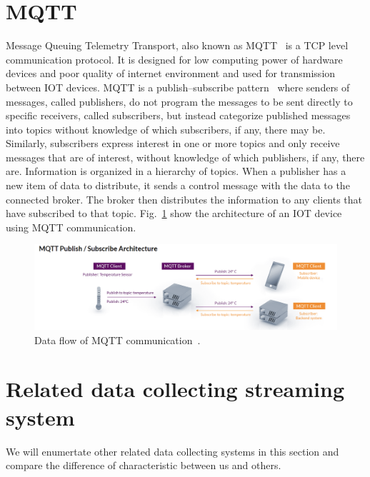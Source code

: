 \section{MQTT}
Message Queuing Telemetry Transport, also known as MQTT~\cite{mqtt-intro} is a TCP level communication protocol. It is designed for low computing power of hardware devices and poor quality of internet environment and used for transmission between IOT devices. MQTT is a publish–subscribe pattern~\cite{pub-sub} where senders of messages, called publishers, do not program the messages to be sent directly to specific receivers, called subscribers, but instead categorize published messages into topics without knowledge of which subscribers, if any, there may be. Similarly, subscribers express interest in one or more topics and only receive messages that are of interest, without knowledge of which publishers, if any, there are. Information is organized in a hierarchy of topics. When a publisher has a new item of data to distribute, it sends a control message with the data to the connected broker. The broker then distributes the information to any clients that have subscribed to that topic. Fig.~\ref{fig:mqtt-data-flow} show the architecture of an IOT device using MQTT communication. 

\begin{figure}[H]
    \centering
    \includegraphics[width=\textwidth]{figsrc/mqtt-data-flow.png}
    \caption{Data flow of MQTT communication~\cite{mqtt-data-flow}.\label{fig:mqtt-data-flow}}
\end{figure}

\section{Related data collecting streaming system}
We will enumertate other related data collecting systems in this section and compare the difference of characteristic between us and others.

